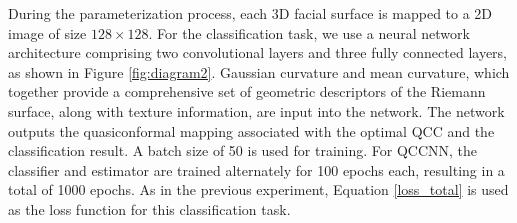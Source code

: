 During the parameterization process, each 3D facial surface is mapped to a 2D image of size $128 \times 128$. For the classification task, we use a neural network architecture comprising two convolutional layers and three fully connected layers, as shown in Figure \ref{fig:diagram2}. Gaussian curvature and mean curvature, which together provide a comprehensive set of geometric descriptors of the Riemann surface, along with texture information, are input into the network. The network outputs the quasiconformal mapping associated with the optimal QCC and the classification result. A batch size of 50 is used for training. For QCCNN, the classifier and estimator are trained alternately for 100 epochs each, resulting in a total of 1000 epochs. As in the previous experiment, Equation \ref{loss_total} is used as the loss function for this classification task.

